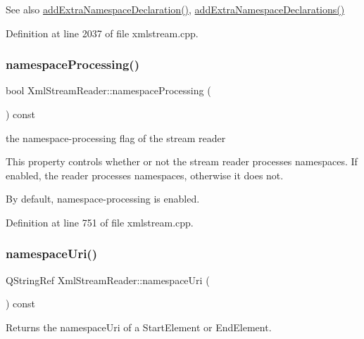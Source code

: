 \begin{DoxySeeAlso}{See also}
\hyperlink{class_xml_stream_reader_a6c6b71cc9f62ad5c1b85c207ba1be850}{add\+Extra\+Namespace\+Declaration()}, \hyperlink{class_xml_stream_reader_a8661643768d54c1c49645a59abed5d29}{add\+Extra\+Namespace\+Declarations()} 
\end{DoxySeeAlso}


Definition at line 2037 of file xmlstream.\+cpp.

\mbox{\label{class_xml_stream_reader_ab834393cf21f28f8ae088b19033cacfa}} 
\subsubsection{\texorpdfstring{namespace\+Processing()}{namespaceProcessing()}}
{\footnotesize\ttfamily bool Xml\+Stream\+Reader\+::namespace\+Processing (\begin{DoxyParamCaption}{ }\end{DoxyParamCaption}) const}

the namespace-\/processing flag of the stream reader

This property controls whether or not the stream reader processes namespaces. If enabled, the reader processes namespaces, otherwise it does not.

By default, namespace-\/processing is enabled. 

Definition at line 751 of file xmlstream.\+cpp.

\mbox{\label{class_xml_stream_reader_a4ea3344f8632d1cd70edfaddf9a8027c}} 
\subsubsection{\texorpdfstring{namespace\+Uri()}{namespaceUri()}}
{\footnotesize\ttfamily Q\+String\+Ref Xml\+Stream\+Reader\+::namespace\+Uri (\begin{DoxyParamCaption}{ }\end{DoxyParamCaption}) const}

Returns the namespace\+Uri of a Start\+Element or End\+Element.

